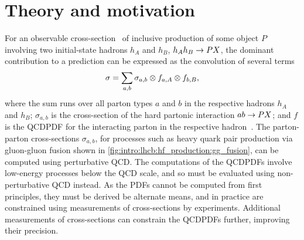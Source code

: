 \chapter{Theory and motivation}
\label{chap:prod:theory}

For an observable cross-section \xsec\ of inclusive production of some object 
$P$ involving two initial-state hadrons $h_{A}$ and $h_{B}$, 
$h_{A}h_{B} \to PX$, the dominant contribution to a prediction can be 
expressed as the convolution of several terms
\begin{equation}
  \sigma = \sum_{a,b} \sigma_{a,b} \otimes f_{a,A} \otimes f_{b,B},
  \label{eqn:prod:theory:factorisation}
\end{equation}
where the sum runs over all parton types $a$ and $b$ in the respective hadrons 
$h_{A}$ and $h_{B}$; $\sigma_{a,b}$ is the cross-section of the hard partonic 
interaction $ab \to PX$; and $f$ is the \ac{QCDPDF} for the interacting 
parton in the respective hadron~\cite{Collins:1989gx,Forte:2013wc}.
The parton-parton cross-sections $\sigma_{a,b}$, for processes such as heavy 
quark pair production via gluon-gluon fusion shown in 
\cref{fig:intro:lhcb:hf_production:gg_fusion}, can be computed using 
perturbative \ac{QCD}.
The computations of the \acp{QCDPDF} involve low-energy processes below the 
\ac{QCD} scale, and so must be evaluated using non-perturbative \ac{QCD} 
instead.
As the \acp{PDF} cannot be computed from first principles, they must be derived 
be alternate means, and in practice are constrained using measurements of 
cross-sections by experiments.
Additional measurements of cross-sections can constrain the \acp{QCDPDF} 
further, improving their precision.

